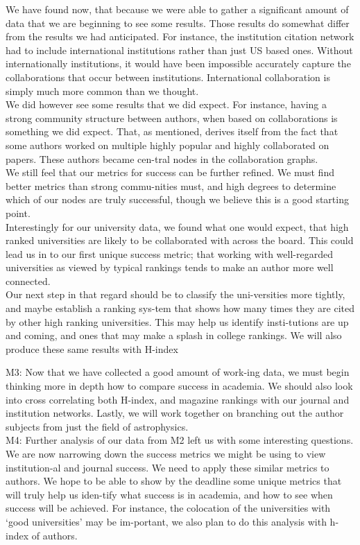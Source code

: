 \documentclass[times, 10pt,twocolumn]{article}
\begin{document}
We have found now, that because we were able to gather a significant amount of data that we are beginning to see some results. Those results do somewhat differ from the results we had anticipated. For instance, the institution citation network had to include international institutions rather than just US based ones. Without internationally institutions, it would have been impossible accurately capture the collaborations that occur between institutions. International collaboration is simply much more common than we thought. \\
We did however see some results that we did expect. For instance, having a strong community structure between authors, when based on collaborations is something we did expect. That, as mentioned, derives itself from the fact that some authors worked on multiple highly popular and highly collaborated on papers. These authors became cen-tral nodes in the collaboration graphs. \\
We still feel that our metrics for success can be further refined. We must find better metrics than strong commu-nities must, and high degrees to determine which of our nodes are truly successful, though we believe this is a good starting point.\\
Interestingly for our university data, we found what one would expect, that high ranked universities are likely to be collaborated with across the board. This could lead us in to our first unique success metric; that working with well-regarded universities as viewed by typical rankings tends to make an author more well connected. \\
Our next step in that regard should be to classify the uni-versities more tightly, and maybe establish a ranking sys-tem that shows how many times they are cited by other high ranking universities. This may help us identify insti-tutions are up and coming, and ones that may make a splash in college rankings. We will also produce these same results with H-index

M3: Now that we have collected a good amount of work-ing data, we must begin thinking more in depth how to compare success in academia. We should also look into cross correlating both H-index, and magazine rankings with our journal and institution networks. Lastly, we will work together on branching out the author subjects from just the field of astrophysics. \\
M4: Further analysis of our data from M2 left us with some interesting questions. We are now narrowing down the success metrics we might be using to view institution-al and journal success. We need to apply these similar metrics to authors. We hope to be able to show by the deadline some unique metrics that will truly help us iden-tify what success is in academia, and how to see when success will be achieved. For instance, the colocation of the universities with ‘good universities’ may be im-portant, we also plan to do this analysis with  h-index of authors.
\end{document}

